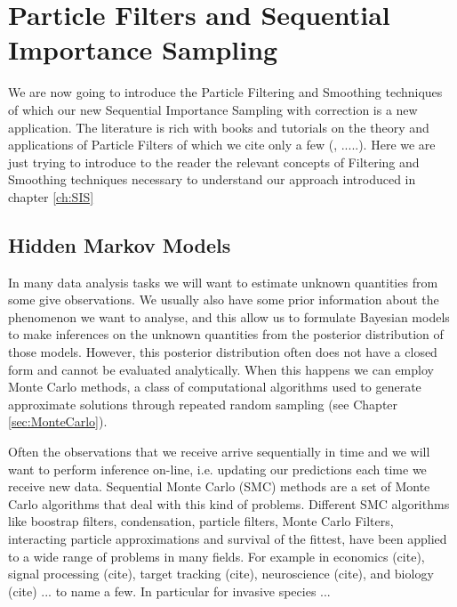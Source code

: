\chapter[Particle Filters and Sequential Importance Sampling]{Particle Filters and Sequential Importance Sampling}
\label{ch:PF}




We are now going to introduce the Particle Filtering and Smoothing techniques of which our new Sequential Importance Sampling with correction is a new application.
The literature is rich with books and tutorials on the theory and applications of Particle Filters of which we cite only a few (\cite{DoucetBook}, \cite{DoucetTutorial} \cite{Speekenbrink} .....). Here we are just trying to introduce to the reader the relevant concepts of Filtering and Smoothing techniques necessary to understand our approach introduced in chapter \ref{ch:SIS}


\section{Hidden Markov Models} \label{sec:HMM}

In many data analysis tasks we will want to estimate unknown quantities from some give observations. We usually also have some prior information about the phenomenon we want to analyse, and this allow us to formulate Bayesian models to make inferences on the unknown quantities from the posterior distribution of those models. However, this posterior distribution often does not have a closed form and cannot be evaluated analytically. When this happens we can employ Monte Carlo methods, a class of computational algorithms used to generate approximate solutions through repeated random sampling (see Chapter \ref{sec:MonteCarlo}).

Often the observations that we receive arrive sequentially in time and we will want to perform inference on-line, i.e. updating our predictions each time we receive new data. Sequential Monte Carlo (SMC) methods are a set of Monte Carlo algorithms that deal with this kind of problems. 
Different SMC algorithms like boostrap filters, condensation, particle filters, Monte Carlo Filters, interacting particle approximations and survival of the fittest, have been applied to a wide range of problems in many fields. For example in economics (cite), signal processing (cite), target tracking (cite), neuroscience (cite), and biology (cite) ... to name a few. In particular for invasive species ...

